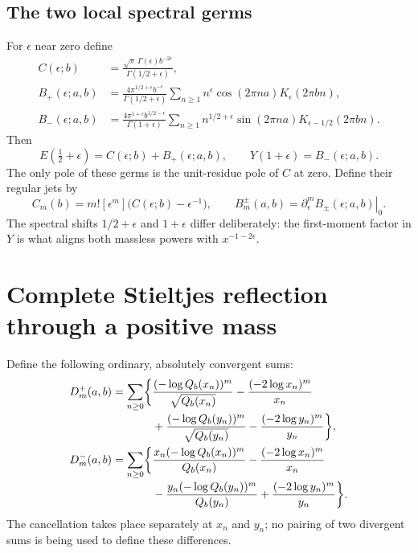 \documentclass[11pt,letterpaper]{article}
\numberwithin{equation}{section}
\theoremstyle{definition}
\begin{document}
\subsection{The two local spectral germs}
For $\epsilon$ near zero define
\begin{align}
C(\epsilon;b)&=\frac{\sqrt\pi\,\Gamma(\epsilon)b^{-2\epsilon}}
                         {\Gamma(1/2+\epsilon)},\label{qspec:eq:Cgerm}\\
B_+(\epsilon;a,b)&=
\frac{4\pi^{1/2+\epsilon}b^{-\epsilon}}{\Gamma(1/2+\epsilon)}
\sum_{n\ge1}n^\epsilon\cos(2\pi na)K_\epsilon(2\pi bn),\label{qspec:eq:Bplusgerm}\\
B_-(\epsilon;a,b)&=
\frac{4\pi^{1+\epsilon}b^{1/2-\epsilon}}{\Gamma(1+\epsilon)}
\sum_{n\ge1}n^{1/2+\epsilon}\sin(2\pi na)
 K_{\epsilon-1/2}(2\pi bn).\label{qspec:eq:Bminusgerm}
\end{align}
Then
\begin{equation}\label{qspec:eq:germ-identities}
E(\tfrac12+\epsilon)=C(\epsilon;b)+B_+(\epsilon;a,b),
\qquad Y(1+\epsilon)=B_-(\epsilon;a,b).
\end{equation}
The only pole of these germs is the unit-residue pole of $C$ at zero.
Define their regular jets by
\begin{equation}\label{qspec:eq:jet-definitions}
C_m(b)=m![\epsilon^m]\bigl(C(\epsilon;b)-\epsilon^{-1}\bigr),
\qquad B_m^\pm(a,b)=\left.\partial_\epsilon^m B_\pm(\epsilon;a,b)\right|_{0}.
\end{equation}
The spectral shifts $1/2+\epsilon$ and $1+\epsilon$ differ deliberately:
the first-moment factor in $Y$ is what aligns both massless powers with
$x^{-1-2\epsilon}$.


\section{Complete Stieltjes reflection through a positive mass}
\label{qspec:sec:stieltjes}

Define the following ordinary, absolutely convergent sums:
\begin{align}
D_m^+(a,b)=\sum_{n\ge0}\biggl\{&
\frac{(-\log Q_b(x_n))^m}{\sqrt{Q_b(x_n)}}
-\frac{(-2\log x_n)^m}{x_n}\notag\\[-2pt]
&+\frac{(-\log Q_b(y_n))^m}{\sqrt{Q_b(y_n)}}
-\frac{(-2\log y_n)^m}{y_n}\biggr\},\label{qspec:eq:Dplus}\\
D_m^-(a,b)=\sum_{n\ge0}\biggl\{&
\frac{x_n(-\log Q_b(x_n))^m}{Q_b(x_n)}
-\frac{(-2\log x_n)^m}{x_n}\notag\\[-2pt]
&-\frac{y_n(-\log Q_b(y_n))^m}{Q_b(y_n)}
+\frac{(-2\log y_n)^m}{y_n}\biggr\}.
\label{qspec:eq:Dminus}
\end{align}
The cancellation takes place separately at $x_n$ and $y_n$; no pairing of
two divergent sums is being used to define these differences.
\end{document}
